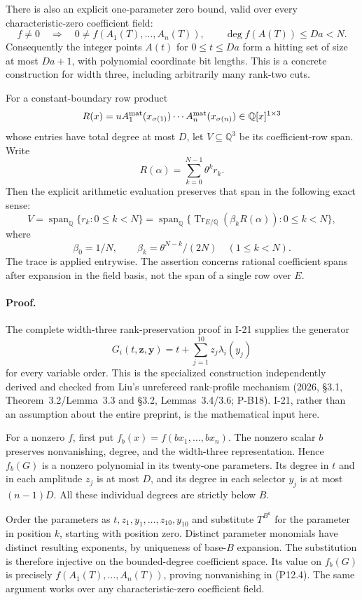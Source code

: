 There is also an explicit one-parameter zero bound, valid over every characteristic-zero coefficient field:
\[
 f\ne0\quad\Longrightarrow\quad
 0\ne f(A_1(T),\ldots,A_n(T)),\qquad
 \deg f(A(T))\le Da<N.
 \tag{P12.4}
\]
Consequently the integer points $A(t)$ for $0\le t\le Da$ form a hitting set of size at most $Da+1$, with polynomial coordinate bit lengths.  This is a concrete construction for width three, including arbitrarily many rank-two cuts.

For a constant-boundary row product
\[
 R(x)=uA^{\rm mat}_1(x_{\sigma(1)})\cdots
          A^{\rm mat}_n(x_{\sigma(n)})\in\mathbb Q[x]^{1\times3}
\]
whose entries have total degree at most $D$, let $V\subseteq\mathbb Q^3$ be its coefficient-row span.  Write
\[
 R(\alpha)=\sum_{k=0}^{N-1}\theta^k r_k.
\]
Then the explicit arithmetic evaluation preserves that span in the following exact sense:
\[
 V=\operatorname{span}_{\mathbb Q}\{r_k:0\le k<N\}
  =\operatorname{span}_{\mathbb Q}
       \{\operatorname{Tr}_{E/\mathbb Q}(\beta_k R(\alpha)):0\le k<N\},
 \tag{P12.5}
\]
where
\[
 \beta_0=1/N,\qquad \beta_k=\theta^{N-k}/(2N)\quad(1\le k<N).
\]
The trace is applied entrywise.  The assertion concerns rational coefficient spans after expansion in the field basis, not the span of a single row over $E$.

\paragraph{Proof.}
The complete width-three rank-preservation proof in I-21 supplies the generator
\[
 G_i(t,\mathbf z,\mathbf y)=t+\sum_{j=1}^{10}z_j\lambda_i(y_j)
\]
for every variable order.  This is the specialized construction independently derived and checked from Liu's unrefereed rank-profile mechanism (2026, \S3.1, Theorem~3.2/Lemma~3.3 and \S3.2, Lemmas~3.4/3.6; P-B18).  I-21, rather than an assumption about the entire preprint, is the mathematical input here.

For a nonzero $f$, first put $f_b(x)=f(bx_1,\ldots,bx_n)$.  The nonzero scalar $b$ preserves nonvanishing, degree, and the width-three representation.  Hence $f_b(G)$ is a nonzero polynomial in its twenty-one parameters.  Its degree in $t$ and in each amplitude $z_j$ is at most $D$, and its degree in each selector $y_j$ is at most $(n-1)D$.  All these individual degrees are strictly below $B$.

Order the parameters as $t,z_1,y_1,\ldots,z_{10},y_{10}$ and substitute $T^{B^k}$ for the parameter in position $k$, starting with position zero.  Distinct parameter monomials have distinct resulting exponents, by uniqueness of base-$B$ expansion.  The substitution is therefore injective on the bounded-degree coefficient space.  Its value on $f_b(G)$ is precisely $f(A_1(T),\ldots,A_n(T))$, proving nonvanishing in (P12.4).  The same argument works over any characteristic-zero coefficient field.

